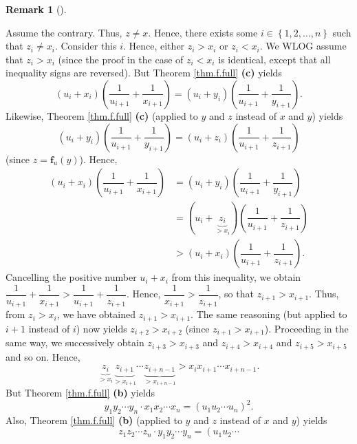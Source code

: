 \documentclass[numbers=enddot,12pt,final,onecolumn,notitlepage]{scrartcl}%
\theoremstyle{definition}
\newtheorem{remk}[theo]{Remark}
\newenvironment{remark}[1][]
{\begin{remk}[#1]\begin{leftbar}}
{\end{leftbar}\end{remk}}
\begin{document}
\begin{remark}
Assume the contrary. Thus, $z\neq x$. Hence, there exists some $i\in\left\{
1,2,\ldots,n\right\}  $ such that $z_{i}\neq x_{i}$. Consider this $i$. Hence,
either $z_{i}>x_{i}$ or $z_{i}<x_{i}$. We WLOG assume that $z_{i}>x_{i}$
(since the proof in the case of $z_{i}<x_{i}$ is identical, except that all
inequality signs are reversed). But Theorem \ref{thm.f.full} \textbf{(c)}
yields%
\[
\left(  u_{i}+x_{i}\right)  \left(  \dfrac{1}{u_{i+1}}+\dfrac{1}{x_{i+1}%
}\right)  =\left(  u_{i}+y_{i}\right)  \left(  \dfrac{1}{u_{i+1}}+\dfrac
{1}{y_{i+1}}\right)  .
\]
Likewise, Theorem \ref{thm.f.full} \textbf{(c)} (applied to $y$ and $z$
instead of $x$ and $y$) yields%
\[
\left(  u_{i}+y_{i}\right)  \left(  \dfrac{1}{u_{i+1}}+\dfrac{1}{y_{i+1}%
}\right)  =\left(  u_{i}+z_{i}\right)  \left(  \dfrac{1}{u_{i+1}}+\dfrac
{1}{z_{i+1}}\right)
\]
(since $z=\mathbf{f}_{u}\left(  y\right)  $). Hence,%
\begin{align*}
\left(  u_{i}+x_{i}\right)  \left(  \dfrac{1}{u_{i+1}}+\dfrac{1}{x_{i+1}%
}\right)   &  =\left(  u_{i}+y_{i}\right)  \left(  \dfrac{1}{u_{i+1}}%
+\dfrac{1}{y_{i+1}}\right) \\
&  =\left(  u_{i}+\underbrace{z_{i}}_{>x_{i}}\right)  \left(  \dfrac
{1}{u_{i+1}}+\dfrac{1}{z_{i+1}}\right) \\
&  >\left(  u_{i}+x_{i}\right)  \left(  \dfrac{1}{u_{i+1}}+\dfrac{1}{z_{i+1}%
}\right)  .
\end{align*}
Cancelling the positive number $u_{i}+x_{i}$ from this inequality, we obtain
$\dfrac{1}{u_{i+1}}+\dfrac{1}{x_{i+1}}>\dfrac{1}{u_{i+1}}+\dfrac{1}{z_{i+1}}$.
Hence, $\dfrac{1}{x_{i+1}}>\dfrac{1}{z_{i+1}}$, so that $z_{i+1}>x_{i+1}$.
Thus, from $z_{i}>x_{i}$, we have obtained $z_{i+1}>x_{i+1}$. The same
reasoning (but applied to $i+1$ instead of $i$) now yields $z_{i+2}>x_{i+2}$
(since $z_{i+1}>x_{i+1}$). Proceeding in the same way, we successively obtain
$z_{i+3}>x_{i+3}$ and $z_{i+4}>x_{i+4}$ and $z_{i+5}>x_{i+5}$ and so on.
Hence,%
\begin{equation}
\underbrace{z_{i}}_{>x_{i}}\underbrace{z_{i+1}}_{>x_{i+1}}\cdots
\underbrace{z_{i+n-1}}_{>x_{i+n-1}}>x_{i}x_{i+1}\cdots x_{i+n-1}.
\label{eq.rmk.f.invol-by-trick.7}%
\end{equation}
But Theorem \ref{thm.f.full} \textbf{(b)} yields%
\[
y_{1}y_{2}\cdots y_{n}\cdot x_{1}x_{2}\cdots x_{n}=\left(  u_{1}u_{2}\cdots
u_{n}\right)  ^{2}.
\]
Also, Theorem \ref{thm.f.full} \textbf{(b)} (applied to $y$ and $z$ instead of
$x$ and $y$) yields%
\[
z_{1}z_{2}\cdots z_{n}\cdot y_{1}y_{2}\cdots y_{n}=\left(  u_{1}u_{2}\cdots
\]
\end{remark}
\end{document}
